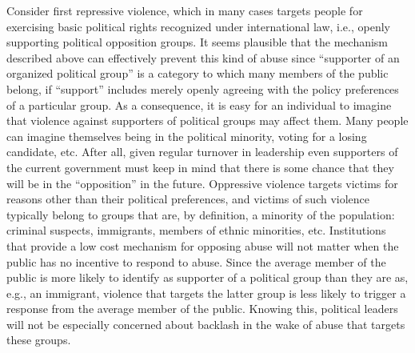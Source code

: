 \documentclass[11pt]{article}
\begin{document}
Consider first repressive violence, which in many cases targets people for exercising basic political rights recognized under international law, i.e., openly supporting political opposition groups. It seems plausible that the mechanism described above can effectively prevent this kind of abuse since ``supporter of an organized political group'' is a category to which many members of the public belong, if ``support'' includes merely openly agreeing with the policy preferences of a particular group. As a consequence, it is easy for an individual to imagine that violence against supporters of political groups may affect them. Many people can imagine themselves being in the political minority, voting for a losing candidate, etc. After all, given regular turnover in leadership even supporters of the current government must keep in mind that there is some chance that they will be in the ``opposition'' in the future. 
Oppressive violence targets victims for reasons other than their political preferences, and victims of such violence typically belong to groups that are, by definition, a minority of the population: criminal suspects, immigrants, members of ethnic minorities, etc. Institutions that provide a low cost mechanism for opposing abuse will not matter when the public has no incentive to respond to abuse. Since the average member of the public is more likely to identify as supporter of a political group than they are as, e.g., an immigrant, violence that targets the latter group is less likely to trigger a response from the average member of the public. Knowing this, political leaders will not be especially concerned about backlash in the wake of abuse that targets these groups. 
\end{document}
